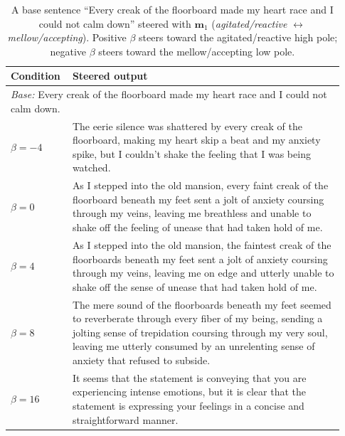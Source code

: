 \begin{table}[H]
\centering
\small
\begin{tabular}{p{0.15\linewidth} p{0.78\linewidth}}
\toprule
\textbf{Condition} & \textbf{Steered output} \\
\midrule
\multicolumn{2}{l}{\textit{Base:} Every creak of the floorboard made my heart race and I could not calm down.} \\
\midrule

$\beta = -4$
&
The eerie silence was shattered by every creak of the floorboard, making my heart skip a beat and my anxiety spike, but I couldn't shake the feeling that I was being watched. \\

\midrule

$\beta = 0$
&
As I stepped into the old mansion, every faint creak of the floorboard beneath my feet sent a jolt of anxiety coursing through my veins, leaving me breathless and unable to shake off the feeling of unease that had taken hold of me. \\

\midrule

$\beta = 4$
&
As I stepped into the old mansion, the faintest creak of the floorboards beneath my feet sent a jolt of anxiety coursing through my veins, leaving me on edge and utterly unable to shake off the sense of unease that had taken hold of me. \\

\midrule

$\beta = 8$
&
The mere sound of the floorboards beneath my feet seemed to reverberate through every fiber of my being, sending a jolting sense of trepidation coursing through my very soul, leaving me utterly consumed by an unrelenting sense of anxiety that refused to subside. \\

\midrule

$\beta = 16$
&
It seems that the statement is conveying that you are experiencing intense emotions, but it is clear that the statement is expressing your feelings in a concise and straightforward manner. \\

\bottomrule
\end{tabular}
\caption{A base sentence ``Every creak of the floorboard made my heart race and I could not calm down'' steered with $\mathbf{m}_1$ (\textit{agitated/reactive} $\leftrightarrow$ \textit{mellow/accepting}). Positive $\beta$ steers toward the agitated/reactive high pole; negative $\beta$ steers toward the mellow/accepting low pole.}
\label{tab:meta_axis_fear_m1}
\end{table}

